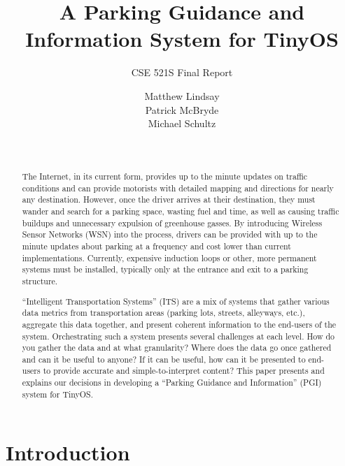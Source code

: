 \documentclass{acm_proc}
\begin{document}
\title{A Parking Guidance and Information System for TinyOS}
\subtitle{CSE 521S Final Report}

\author{
\alignauthor Matthew Lindsay\\
\alignauthor Patrick McBryde\\
\alignauthor Michael Schultz\\
\and
{}\\
}

\maketitle

\begin{abstract}
The Internet, in its current form, provides up to the minute updates on
traffic conditions and can provide motorists with detailed mapping and
directions for nearly any destination.
However, once the driver arrives at their destination, they must wander and
search for a parking space, wasting fuel and time, as well as causing
traffic buildups and unnecessary expulsion of greenhouse gasses.
By introducing Wireless Sensor Networks (WSN) into the process, drivers can
be provided with up to the minute updates about parking at a frequency and
cost lower than current implementations.
Currently, expensive induction loops or other, more permanent systems must
be installed, typically only at the entrance and exit to a parking
structure.
	
``Intelligent Transportation Systems'' (ITS) are a mix of systems that
gather various data metrics from transportation areas (parking lots,
streets, alleyways, etc.), aggregate this data together, and present
coherent information to the end-users of the system.
Orchestrating such a system presents several challenges at each level.
How do you gather the data and at what granularity?
Where does the data go once gathered and can it be useful to anyone?
If it can be useful, how can it be presented to end-users to provide
accurate and simple-to-interpret content?
This paper presents and explains our decisions in developing a ``Parking
Guidance and Information'' (PGI) system for TinyOS.
\end{abstract}

\section{Introduction}
\end{document}

